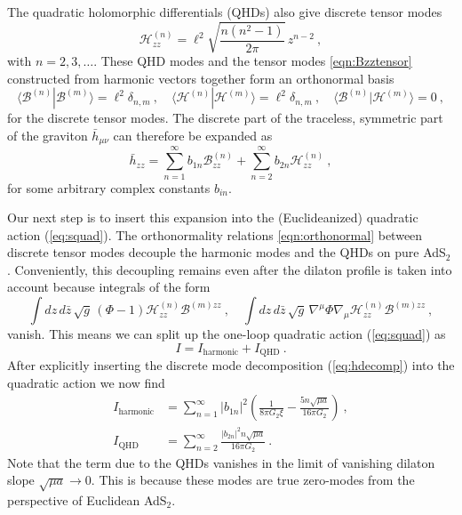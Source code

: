 \documentclass[12pt]{article}
\begin{document}
The quadratic holomorphic differentials (QHDs) also give discrete tensor modes
\begin{equation}
	\mathcal{H}^{(n)}_{zz} = \ell^2\sqrt{\frac{n(n^2-1)}{2\pi}}\,z^{n-2}~,
\end{equation}
with $n = 2,3,\ldots$.  These QHD modes and the tensor modes \eqref{eqn:Bzztensor} constructed from harmonic vectors together form an orthonormal basis 
\begin{equation}
	\langle \mathcal{B}^{(n)} | \mathcal{B}^{(m)}\rangle = \ell^2 \delta_{n,m}~, \quad \langle \mathcal{H}^{(n)} | \mathcal{H}^{(m)} \rangle = \ell^2 \delta_{n,m}~, \quad \langle \mathcal{B}^{(n)} | \mathcal{H}^{(m)}\rangle = 0~,
	\label{eqn:orthonormal}
\end{equation}
for the discrete tensor modes. The discrete part of the traceless, symmetric part of the graviton $\bar{h}_{\mu\nu}$ can therefore be expanded as
\begin{equation}
	\bar{h}_{zz} = \sum_{n=1}^\infty b_{1 n} \mathcal{B}_{zz}^{(n)} + \sum_{n=2}^\infty b_{2n} \mathcal{H}^{(n)}_{zz}~,
\label{eq:hdecomp}
\end{equation}
for some arbitrary complex constants $b_{i n}$.

Our next step is to insert this expansion into the (Euclideanized) quadratic action (\ref{eq:squad}). The orthonormality relations \eqref{eqn:orthonormal} between discrete tensor modes decouple the harmonic modes and the QHDs on pure AdS$_2$ . Conveniently, this decoupling remains even after the dilaton profile is taken into account because integrals of the form
\begin{equation}
	\int dz\,d\bar{z}\,\sqrt{g}\,\left(\Phi - 1\right) \mathcal{H}^{(n)}_{zz} \mathcal{B}^{(m)z z}~, \quad \int dz\,d\bar{z}\,\sqrt{g}\,\nabla^\mu \Phi \nabla_\mu \mathcal{H}^{(n)}_{zz} \mathcal{B}^{(m)z z}~,
\end{equation}
vanish. This means we can split up the one-loop quadratic action (\ref{eq:squad}) as
\begin{equation}
	I = I_\text{harmonic} + I_\text{QHD}~.
\end{equation}
After explicitly inserting the discrete mode decomposition (\ref{eq:hdecomp}) into the quadratic action we now find 
\begin{equation}\begin{aligned}
	I_\text{harmonic} &= \sum_{n=1}^\infty |b_{1 n}|^2\left(\frac{1}{8\pi G_2 \xi}-\frac{5n\sqrt{\mu a}}{16\pi G_2}\right)~, \\
	I_\text{QHD} &= \sum_{n=2}^\infty \frac{|b_{2n}|^2 n \sqrt{\mu a}}{16\pi G_2}~.
	\label{eqn:harmQHD}
\end{aligned}\end{equation}
Note that the term due to the QHDs vanishes in the limit of vanishing dilaton slope $\sqrt{\mu a} \to 0$. This is because these modes are true zero-modes from the perspective of Euclidean AdS$_2$.  
\end{document}
